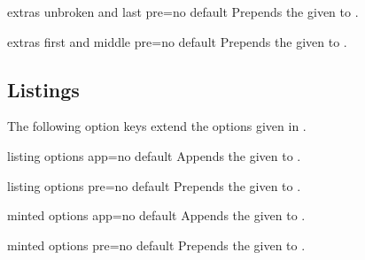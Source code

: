 \begin{docTcbKey}[][doc new=2015-07-16]{extras unbroken and last pre}{=}{no default}
  Prepends the given  to .
\end{docTcbKey}

\begin{docTcbKey}[][doc new=2015-07-16]{extras first and middle pre}{=}{no default}
  Prepends the given  to .
\end{docTcbKey}


\subsection{Listings}
The following option keys extend the options given in
.


\begin{docTcbKey}[][doc new=2019-07-11]{listing options app}{=}{no default}
  Appends the given  to .
\end{docTcbKey}

\begin{docTcbKey}[][doc new=2019-07-11]{listing options pre}{=}{no default}
  Prepends the given  to .
\end{docTcbKey}

\begin{docTcbKey}[][doc new=2019-07-11]{minted options app}{=}{no default}
  Appends the given  to .
\end{docTcbKey}

\begin{docTcbKey}[][doc new=2019-07-11]{minted options pre}{=}{no default}
  Prepends the given  to .
\end{docTcbKey}


